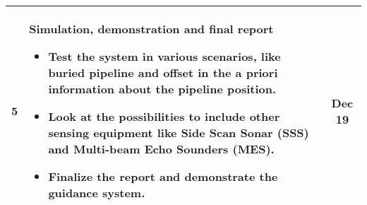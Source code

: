 \documentclass[a4paper,10pt]{article}
\begin{document}
\begin{tabular}{| c | p{9cm} || c |}
	\hline
	5	&	\textbf{Simulation, demonstration and final report}
						\begin{itemize}
						 \item Test the system in various scenarios, like buried pipeline and offset in the a priori information about the pipeline position.
						 \item Look at the possibilities to include other sensing equipment like Side Scan Sonar (SSS) and Multi-beam Echo Sounders (MES).
						 \item Finalize the report and demonstrate the guidance system.
						\end{itemize}
								&	Dec 19 \\
	\hline
	\end{tabular}
\end{document}
